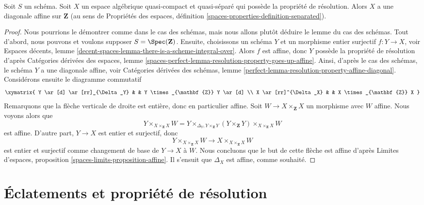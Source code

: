 \begin{lemma}
\label{lemma-resolution-property-affine-diagonal}
Soit $S$ un schéma.
Soit $X$ un espace algébrique quasi-compact et quasi-séparé qui possède
la propriété de résolution. Alors $X$ a une diagonale affine sur $\mathbf{Z}$
(au sens de Propriétés des espaces, définition
\ref{spaces-properties-definition-separated}).
\end{lemma}

\begin{proof}
Nous pourrions le démontrer comme dans le cas des schémas, mais nous allons plutôt
déduire le lemme du cas des schémas.
Tout d'abord, nous pouvons et voulons supposer $S = \Spec(\mathbf{Z})$.
Ensuite, choisissons un schéma $Y$ et un morphisme entier surjectif
$f : Y \to X$, voir
Espaces décents, lemme \ref{decent-spaces-lemma-there-is-a-scheme-integral-over}.
Alors $f$ est affine, donc $Y$ possède la propriété de résolution d'après
Catégories dérivées des espaces, lemme
\ref{spaces-perfect-lemma-resolution-property-goes-up-affine}.
Ainsi, d'après le cas des schémas, le schéma $Y$ a une diagonale affine, voir
Catégories dérivées des schémas, lemme
\ref{perfect-lemma-resolution-property-affine-diagonal}.
Considérons ensuite le diagramme commutatif
$$
\xymatrix{
Y \ar[d] \ar[rr]_{\Delta_Y} & & Y \times_{\mathbf{Z}} Y \ar[d] \\
X \ar[rr]^{\Delta_X} & & X \times_{\mathbf{Z}} X
}
$$
Remarquons que la flèche verticale de droite est entière, donc en particulier
affine. Soit $W \to X \times_{\mathbf{Z}} X$ un morphisme avec $W$ affine.
Nous voyons alors que
$$
Y \times_{X \times_{\mathbf{Z}} X} W =
Y \times_{\Delta_Y, Y \times_{\mathbf{Z}} Y}
(Y \times_{\mathbf{Z}} Y) \times_{X \times_{\mathbf{Z}} X} W
$$
est affine. D'autre part, $Y \to X$ est entier et surjectif,
donc
$$
Y \times_{X \times_{\mathbf{Z}} X} W
\longrightarrow
X \times_{X \times_{\mathbf{Z}} X} W
$$
est entier et surjectif comme changement de base de $Y \to X$ à $W$.
Nous concluons que le but de cette flèche est affine d'après
Limites d'espaces, proposition \ref{spaces-limits-proposition-affine}.
Il s'ensuit que $\Delta_X$ est affine, comme souhaité.
\end{proof}







\section{Éclatements et propriété de résolution}
\label{section-resolution-property-by-blowing-up}

